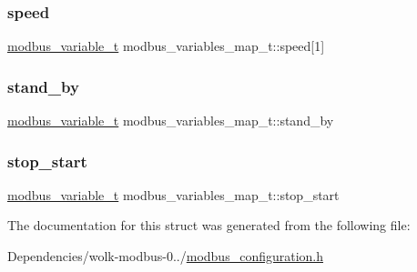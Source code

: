\subsubsection{\texorpdfstring{speed}{speed}}
{\footnotesize\ttfamily \mbox{\hyperlink{structmodbus__variable__t}{modbus\+\_\+variable\+\_\+t}} modbus\+\_\+variables\+\_\+map\+\_\+t\+::speed\mbox{[}1\mbox{]}}

\mbox{\label{structmodbus__variables__map__t_a71fcc7699935d8d17d3c47cc32112d30}} 
\subsubsection{\texorpdfstring{stand\+\_\+by}{stand\_by}}
{\footnotesize\ttfamily \mbox{\hyperlink{structmodbus__variable__t}{modbus\+\_\+variable\+\_\+t}} modbus\+\_\+variables\+\_\+map\+\_\+t\+::stand\+\_\+by}

\mbox{\label{structmodbus__variables__map__t_a3a2bcd493519187817f59405ec4762df}} 
\subsubsection{\texorpdfstring{stop\+\_\+start}{stop\_start}}
{\footnotesize\ttfamily \mbox{\hyperlink{structmodbus__variable__t}{modbus\+\_\+variable\+\_\+t}} modbus\+\_\+variables\+\_\+map\+\_\+t\+::stop\+\_\+start}



The documentation for this struct was generated from the following file\+:\begin{DoxyCompactItemize}
\item 
Dependencies/wolk-\/modbus-\/0../\mbox{\hyperlink{modbus__configuration_8h}{modbus\+\_\+configuration.\+h}}\end{DoxyCompactItemize}
